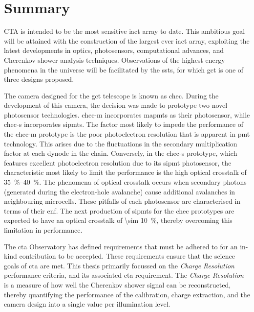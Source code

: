 \chapter{\label{ch9-summary}Summary} 

CTA is intended to be the most sensitive \gls{iact} array to date. This ambitious goal will be attained with the construction of the largest ever \gls{iact} array, exploiting the latest developments in optics, photosensors, computational advances, and Cherenkov shower analysis techniques. Observations of the highest energy phenomena in the universe will be facilitated by the \glspl{sst}, for which \gls{gct} is one of three designs proposed.

The camera designed for the \gls{gct} telescope is known as \gls{chec}. During the development of this camera, the decision was made to prototype two novel photosensor technologies. \gls{chec-m} incorporates \glspl{mapmt} as their photosensor, while \gls{chec-s} incorporates \glspl{sipmt}. The factor most likely to impede the performance of the \gls{chec-m} prototype is the poor photoelectron resolution that is apparent in \gls{pmt} technology. This arises due to the fluctuations in the secondary multiplication factor at each dynode in the chain. Conversely, in the \gls{chec-s} prototype, which features excellent photoelectron resolution due to its \gls{sipmt} photosensor, the characteristic most likely to limit the performance is the high optical crosstalk of \SIrange{35}{40}{\percent}. The phenomena of optical crosstalk occurs when secondary photons (generated during the electron-hole avalanche) cause additional avalanches in neighbouring microcells. These pitfalls of each photosensor are characterised in terms of their \gls{enf}. The next production of \glspl{sipmt} for the \gls{chec} prototypes are expected to have an optical crosstalk of \SI{\sim 10}{\percent}, thereby overcoming this limitation in performance.

The \gls{cta} Observatory has defined requirements that must be adhered to for an in-kind contribution to be accepted. These requirements ensure that the science goals of \gls{cta} are met. This thesis primarily focussed on the \textit{Charge Resolution} performance criteria, and its associated \gls{cta} requirement. The \textit{Charge Resolution} is a measure of how well the Cherenkov shower signal can be reconstructed, thereby quantifying the performance of the calibration, charge extraction, and the camera design into a single value per illumination level.

